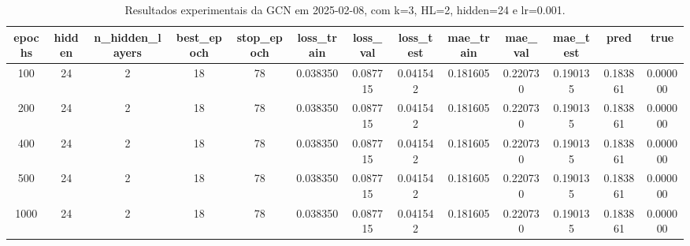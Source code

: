 \begin{table}[h]
\centering
\caption{Resultados experimentais da GCN em 2025-02-08, com k=3, HL=2, hidden=24 e lr=0.001.}
\label{tab:gcn_results_k3_hl2_h24_d20250208}
\begin{tabular}{ccccccccccccc}
\toprule
epochs & hidden & n\_hidden\_layers & best\_epoch & stop\_epoch & loss\_train & loss\_val & loss\_test & mae\_train & mae\_val & mae\_test & pred & true \\
\midrule
100 & 24 & 2 & 18 & 78 & 0.038350 & 0.087715 & 0.041542 & 0.181605 & 0.220730 & 0.190135 & 0.183861 & 0.000000 \\
200 & 24 & 2 & 18 & 78 & 0.038350 & 0.087715 & 0.041542 & 0.181605 & 0.220730 & 0.190135 & 0.183861 & 0.000000 \\
400 & 24 & 2 & 18 & 78 & 0.038350 & 0.087715 & 0.041542 & 0.181605 & 0.220730 & 0.190135 & 0.183861 & 0.000000 \\
500 & 24 & 2 & 18 & 78 & 0.038350 & 0.087715 & 0.041542 & 0.181605 & 0.220730 & 0.190135 & 0.183861 & 0.000000 \\
1000 & 24 & 2 & 18 & 78 & 0.038350 & 0.087715 & 0.041542 & 0.181605 & 0.220730 & 0.190135 & 0.183861 & 0.000000 \\
\bottomrule
\end{tabular}
\end{table}
